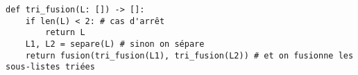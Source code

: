 \ifprof
\begin{corrige}
\end{corrige}
\else
\fi




\ifprof
\begin{corrige}
\begin{lstlisting}
def tri_fusion(L: []) -> []:
    if len(L) < 2: # cas d'arrêt
        return L
    L1, L2 = separe(L) # sinon on sépare
    return fusion(tri_fusion(L1), tri_fusion(L2)) # et on fusionne les sous-listes triées
\end{lstlisting}
\end{corrige}
\else
\fi


